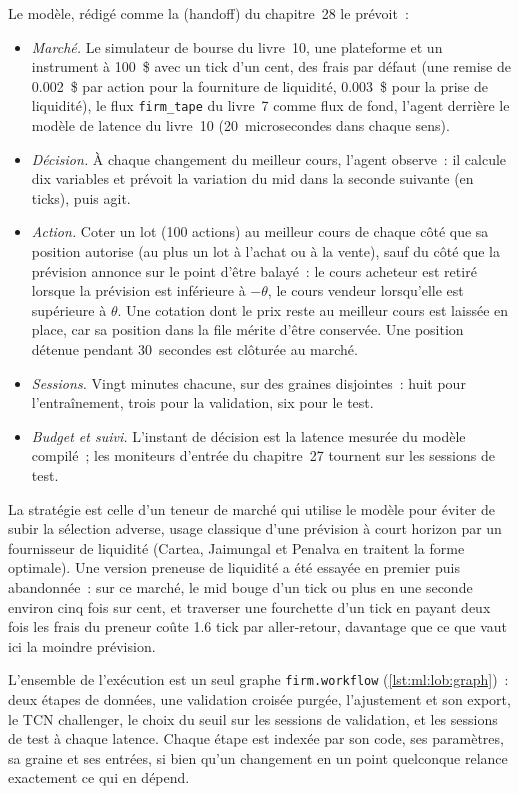 Le modèle, rédigé comme la  (handoff) du chapitre~28 le prévoit~:
\begin{itemize}
\item \emph{Marché.} Le simulateur de bourse du livre~10, une plateforme et un instrument à 100~\$ avec un tick d'un cent, des frais par défaut (une
remise de 0.002~\$ par action pour la fourniture de liquidité, 0.003~\$ pour la prise de liquidité), le flux \texttt{firm\_tape} du livre~7 comme flux de fond,
l'agent derrière le modèle de latence du livre~10 (20~microsecondes dans chaque sens).
\item \emph{Décision.} À chaque changement du meilleur cours, l'agent observe~: il calcule dix variables et prévoit la variation du mid
dans la seconde suivante (en ticks), puis agit.
\item \emph{Action.} Coter un lot (100 actions) au meilleur cours de chaque côté que sa position autorise (au plus un lot à l'achat ou à la vente),
sauf du côté que la prévision annonce sur le point d'être balayé~: le cours acheteur est retiré lorsque la prévision est inférieure à $-\theta$, le cours vendeur
lorsqu'elle est supérieure à $\theta$. Une cotation dont le prix reste au meilleur cours est laissée en place, car sa position dans la file mérite d'être conservée. Une
position détenue pendant 30~secondes est clôturée au marché.
\item \emph{Sessions.} Vingt minutes chacune, sur des graines disjointes~: huit pour l'entraînement, trois pour la validation, six pour le test.
\item \emph{Budget et suivi.} L'instant de décision est la latence mesurée du modèle compilé~; les moniteurs d'entrée du chapitre~27 tournent sur
les sessions de test.
\end{itemize}

La stratégie est celle d'un teneur de marché qui utilise le modèle pour éviter de subir la sélection adverse, usage classique d'une prévision à court horizon par un
fournisseur de liquidité (Cartea, Jaimungal et Penalva en traitent la forme optimale). Une version preneuse de liquidité a été essayée en premier puis abandonnée~: sur
ce marché, le mid bouge d'un tick ou plus en une seconde environ cinq fois sur cent, et traverser une fourchette d'un tick en payant
deux fois les frais du preneur coûte 1.6 tick par aller-retour, davantage que ce que vaut ici la moindre prévision.

L'ensemble de l'exécution est un seul graphe \texttt{firm.workflow} (\cref{lst:ml:lob:graph})~: deux étapes de données, une validation croisée purgée, l'ajustement
et son export, le TCN challenger, le choix du seuil sur les sessions de validation, et les sessions de test à chaque latence.
Chaque étape est indexée par son code, ses paramètres, sa graine et ses entrées, si bien qu'un changement en un point quelconque relance exactement ce qui en dépend.

